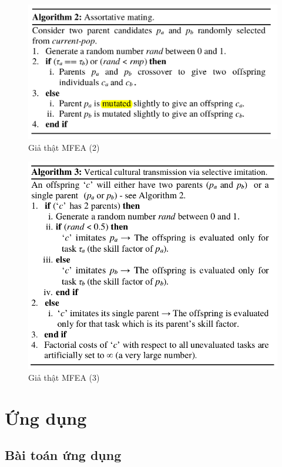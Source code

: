 \documentclass[a4paper,12pt]{report}
\begin{document}
\begin{figure}[H]
\centering 
\includegraphics[scale=0.6]{al2.png}
\caption{Giả thật MFEA (2)}
\end{figure} 

\begin{figure}[H]
\centering 
\includegraphics[scale=0.7]{al3.png}
\caption{Giả thật MFEA (3)}
\end{figure} 





\chapter{Ứng dụng}
\section{Bài toán ứng dụng}
\end{document}
